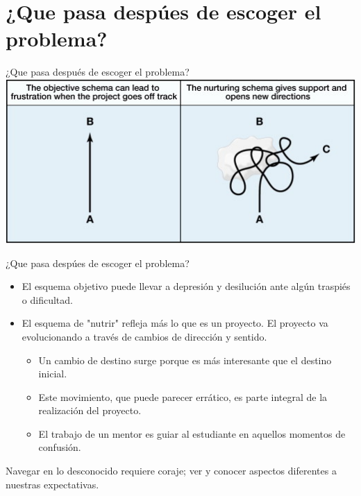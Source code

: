 \documentclass [xcolor=svgnames, t] {beamer}
\begin{document}
\section{¿Que pasa desp\'ues de escoger el problema?}
\begin{frame}{¿Que pasa despu\'es de escoger el problema?}
\includegraphics[width=\textwidth]{fig3_3}
\end{frame}

\begin{frame}{¿Que pasa desp\'ues de escoger el problema?}
\begin{itemize}
\item El esquema objetivo puede llevar a depresi\'on y desiluci\'on ante alg\'un traspi\'es o dificultad.
\item El esquema de "nutrir" refleja m\'as lo que es un proyecto. El proyecto va evolucionando a trav\'es de cambios de direcci\'on y sentido. 
\begin{itemize}
\item Un cambio de destino surge porque es m\'as interesante que el destino inicial.
\item Este movimiento, que puede parecer err\'atico, es parte integral de la realizaci\'on del proyecto. 
\item El trabajo de un mentor es guiar al estudiante en aquellos momentos de confusi\'on.
\end{itemize}
\end{itemize}
\centering
\alert{Navegar en lo desconocido requiere coraje; ver y conocer aspectos diferentes a nuestras expectativas}.
\end{frame}



%        
%        
\end{document}
